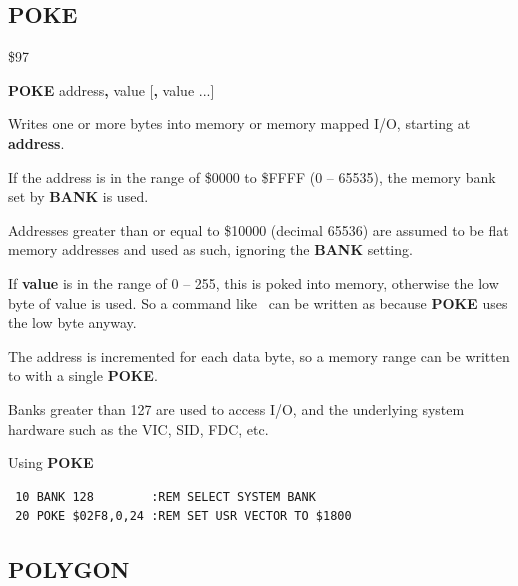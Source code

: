 \subsection{POKE}
\begin{description}[leftmargin=2cm,style=nextline]
\item [Token:] \$97
\item [Format:] {\bf POKE} address{\bf,} value [{\bf,} value ...]
\item [Returns:]  Writes one or more bytes into memory
                or memory mapped I/O, starting at {\bf address}.

                If the address is in the range of \$0000 to \$FFFF (0 -- 65535), the
                memory bank set by {\bf BANK} is used.

                Addresses greater than or equal to \$10000 (decimal 65536) are assumed to be flat memory
                addresses and used as such, ignoring the {\bf BANK} setting.

                If {\bf value} is in the range of 0 -- 255, this is poked into memory,
                otherwise the low byte of value is used. So a command like
                 can be written as
                 because {\bf POKE} uses the low byte anyway.

\item [Remarks:] The address is incremented for each data byte,
                 so a memory range can be written to with a single {\bf POKE}.

                 Banks greater than 127 are used to access I/O, and the underlying system hardware such as the
                 VIC, SID, FDC, etc.

\item [Example:] Using {\bf POKE}

\begin{tcolorbox}[colback=black,coltext=white]
\verbatimfont{\codefont}
\begin{verbatim}
 10 BANK 128        :REM SELECT SYSTEM BANK
 20 POKE $02F8,0,24 :REM SET USR VECTOR TO $1800
\end{verbatim}
\end{tcolorbox}
\end{description}


\newpage
\subsection{POLYGON}

